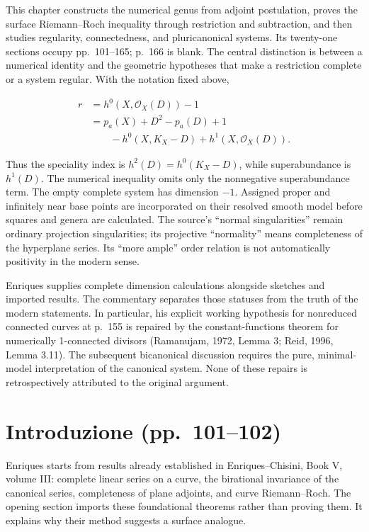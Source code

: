 This chapter constructs the numerical genus from adjoint postulation, proves the surface Riemann--Roch inequality through restriction and subtraction, and then studies regularity, connectedness, and pluricanonical systems. Its twenty-one sections occupy pp.~101--165; p.~166 is blank. The central distinction is between a numerical identity and the geometric hypotheses that make a restriction complete or a system regular. With the notation fixed above,

\[
\begin{aligned}
r&=h^0(X,\mathcal O_X(D))-1\\
 &=p_a(X)+D^2-p_a(D)+1\\
 &\qquad-h^0(X,K_X-D)+h^1(X,\mathcal O_X(D)).
\end{aligned}
\]

Thus the speciality index is \(h^2(D)=h^0(K_X-D)\), while superabundance is \(h^1(D)\). The numerical inequality omits only the nonnegative superabundance term. The empty complete system has dimension \(-1\). Assigned proper and infinitely near base points are incorporated on their resolved smooth model before squares and genera are calculated. The source's ``normal singularities'' remain ordinary projection singularities; its projective ``normality'' means completeness of the hyperplane series. Its ``more ample'' order relation is not automatically positivity in the modern sense.

Enriques supplies complete dimension calculations alongside sketches and imported results. The commentary separates those statuses from the truth of the modern statements. In particular, his explicit working hypothesis for nonreduced connected curves at p.~155 is repaired by the constant-functions theorem for numerically 1-connected divisors (Ramanujam, 1972, Lemma 3; Reid, 1996, Lemma 3.11). The subsequent bicanonical discussion requires the pure, minimal-model interpretation of the canonical system. None of these repairs is retrospectively attributed to the original argument.

\section[Introduzione]{Introduzione (pp.~101--102)}\label{enriques-iv-1}

Enriques starts from results already established in Enriques--Chisini, Book V, volume III: complete linear series on a curve, the birational invariance of the canonical series, completeness of plane adjoints, and curve Riemann--Roch. The opening section imports these foundational theorems rather than proving them. It explains why their method suggests a surface analogue.

